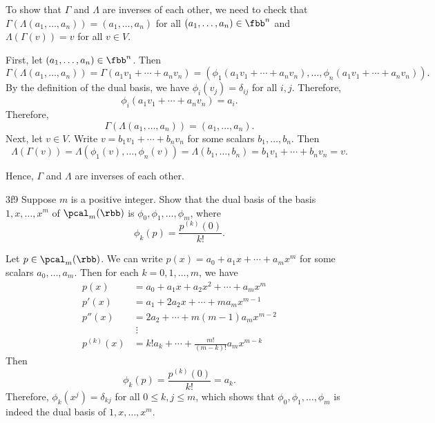 \begin{sol}
    To show that $\Gamma$ and $\Lambda$ are inverses of each other, we need to check that $\Gamma(\Lambda(a_1, \ldots, a_n)) = (a_1, \ldots, a_n)$ for all $(a_1, \ldots, a_n) \in \fbb^n$ and $\Lambda(\Gamma(v)) = v$ for all $v \in V$.

    First, let $(a_1, \ldots, a_n) \in \fbb^n$.
	Then
    \[
    	\Gamma(\Lambda(a_1, \ldots, a_n)) = \Gamma(a_1 v_1 + \cdots + a_n v_n) = (\phi_1(a_1 v_1 + \cdots + a_n v_n), \ldots, \phi_n(a_1 v_1 + \cdots + a_n v_n)).
    \]
    By the definition of the dual basis, we have $\phi_i(v_j) = \delta_{ij}$ for all $i, j$.
	Therefore,
    \[
    	\phi_i(a_1 v_1 + \cdots + a_n v_n) = a_i.
    \]
    Therefore,
    \[
    	\Gamma(\Lambda(a_1, \ldots, a_n)) = (a_1, \ldots, a_n).
    \]
    Next, let $v \in V$.
	Write $v = b_1 v_1 + \cdots + b_n v_n$ for some scalars $b_1, \ldots, b_n$.
	Then
    \[
    	\Lambda(\Gamma(v)) = \Lambda(\phi_1(v), \ldots, \phi_n(v)) = \Lambda(b_1, \ldots, b_n) = b_1 v_1 + \cdots + b_n v_n = v.
    \]

    Hence, $\Gamma$ and $\Lambda$ are inverses of each other.
\end{sol}

\begin{exercise}{3f9}
    Suppose $m$ is a positive integer.
	Show that the dual basis of the basis $1, x, \ldots, x^m$ of $\pcal_m(\rbb)$ is $\phi_0, \phi_1, \ldots, \phi_m$, where
    \[
    	\phi_k(p) = \frac{p^{(k)}(0)}{k!}.
    \]
    
\end{exercise}

\begin{sol}
    Let $p \in \pcal_m(\rbb)$.
	We can write $p(x) = a_0 + a_1 x + \cdots + a_m x^m$ for some scalars $a_0, \ldots, a_m$.
	Then for each $k = 0, 1, \ldots, m$, we have
    \begin{align*}
        p(x) &= a_0 + a_1 x + a_2 x^2 + \cdots + a_m x^m \\
        p'(x) &= a_1 + 2a_2 x + \cdots + ma_m x^{m - 1} \\
        p''(x) &= 2a_2 + \cdots + m(m - 1)a_m x^{m - 2} \\
        &\;\vdots \\
        p^{(k)}(x) &= k!a_k + \cdots + \frac{m!}{(m - k)!} a_m x^{m - k}
    \end{align*}
    Then
    \[
    	\phi_k(p) = \frac{p^{(k)}(0)}{k!} = a_k.
    \]
    Therefore, $\phi_k(x^j) = \delta_{kj}$ for all $0 \leq k, j \leq m$, which shows that $\phi_0, \phi_1, \ldots, \phi_m$ is indeed the dual basis of $1, x, \ldots, x^m$.
\end{sol}

